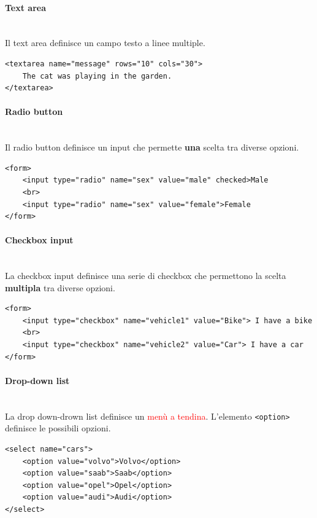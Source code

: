 \documentclass{article}
\begin{document}
\paragraph{Text area} \mbox{} \\
Il text area definisce un campo testo a linee multiple.
\begin{lstlisting}[style=htmlstyle]
<textarea name="message" rows="10" cols="30">
    The cat was playing in the garden.
</textarea>
\end{lstlisting}

\paragraph{Radio button} \mbox{} \\
Il radio button definisce un input che permette \textbf{una} scelta tra diverse opzioni.
\begin{lstlisting}[style=htmlstyle]
<form>
    <input type="radio" name="sex" value="male" checked>Male
    <br>
    <input type="radio" name="sex" value="female">Female
</form>
\end{lstlisting}
\paragraph{Checkbox input} \mbox{} \\ 
La checkbox input definisce una serie di checkbox che permettono la scelta \textbf{multipla} tra diverse opzioni.
\begin{lstlisting}[style=htmlstyle]
<form>
    <input type="checkbox" name="vehicle1" value="Bike"> I have a bike
    <br>
    <input type="checkbox" name="vehicle2" value="Car"> I have a car
</form>
\end{lstlisting}
\paragraph{Drop-down list} \mbox{} \\
La drop down-drown list definisce un \textcolor{red}{menù a tendina}. L'elemento \texttt{<option>} definisce le possibili opzioni.
\begin{lstlisting}[style=htmlstyle]
<select name="cars">
    <option value="volvo">Volvo</option>
    <option value="saab">Saab</option>
    <option value="opel">Opel</option>
    <option value="audi">Audi</option>
</select>
\end{lstlisting}
\pagebreak
\end{document}
